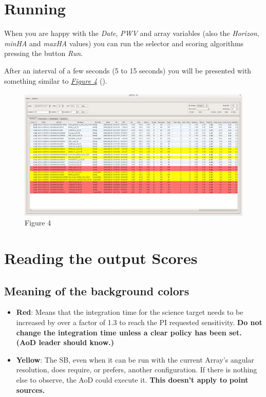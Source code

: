 \documentclass[a4paper,10pt,english]{sphinxmanual}
\begin{document}
\section{Running}
\label{usingwto:running}
When you are happy with the \emph{Date}, \emph{PWV} and
array variables (also the \emph{Horizon}, \emph{minHA} and
\emph{maxHA} values) you can run the selector and scoring algorithms
pressing the button \emph{Run}.

After an interval of a few seconds (5 to 15 seconds) you will be presented
with something similar to {\hyperref[usingwto:fig4]{\emph{Figure 4}}} ().
\begin{figure}[htbp]
\centering
\capstart

\includegraphics{gWTO2__BL_003.png}
\caption{Figure 4}\label{usingwto:fig4}\end{figure}


\section{Reading the output Scores}
\label{usingwto:reading-the-output-scores}

\subsection{Meaning of the background colors}
\label{usingwto:meaning-of-the-background-colors}\begin{itemize}
\item {} 
\textbf{Red}: Means that the integration time for the science target needs to be
increased by over a factor of 1.3 to reach the PI requested sensitivity.
\textbf{Do not change the integration time unless a clear policy has been set.}
\textbf{(AoD leader should know.)}

\item {} 
\textbf{Yellow}: The SB, even when it can be run with the current Array's angular
resolution, does require, or prefers, another configuration. If there is
nothing else to observe, the AoD could execute it. \textbf{This doesn't apply to}
\textbf{point sources.}

\end{itemize}
\end{document}
